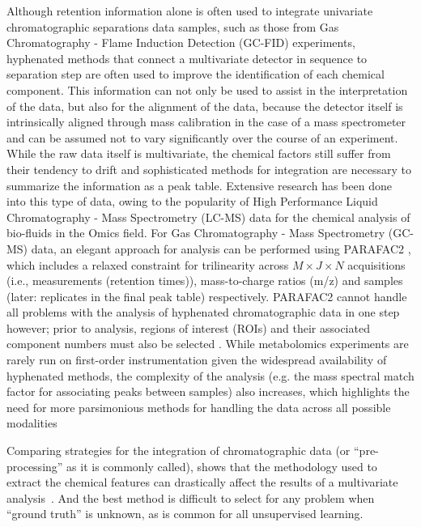 \documentclass[preprint,12pt]{elsarticle}
\begin{document}
Although retention information alone is often used to integrate univariate chromatographic separations data samples, such as those from Gas Chromatography - Flame Induction Detection (GC-FID) experiments, hyphenated methods that connect a multivariate detector in sequence to separation step are often used to improve the identification of each chemical component. This information can not only be used to assist in the interpretation of the data, but also for the alignment of the data, because the detector itself is intrinsically aligned through mass calibration in the case of a mass spectrometer and can be assumed not to vary significantly over the course of an experiment. While the raw data itself is multivariate, the chemical factors still suffer from their tendency to drift and sophisticated methods for integration are necessary to summarize the information as a peak table. Extensive research has been done into this type of data, owing to the popularity of High Performance Liquid Chromatography - Mass Spectrometry (LC-MS) data for the chemical analysis of bio-fluids in the Omics field. For Gas Chromatography - Mass Spectrometry (GC-MS) data, an elegant approach for analysis can be performed using PARAFAC2 \cite{kiers1999parafac2}, which includes a relaxed constraint for trilinearity across $M \times J \times N$ acquisitions (i.e., measurements (retention times)), mass-to-charge ratios (m/z) and samples (later: replicates in the final peak table) respectively. PARAFAC2 cannot handle all problems with the analysis of hyphenated chromatographic data in one step however; prior to analysis, regions of interest (ROIs) and their associated component numbers must also be selected \cite{baccolo2021untargeted,giebelhaus2022untargeted}. While metabolomics experiments are rarely run on first-order instrumentation given the widespread availability of hyphenated methods, the complexity of the analysis (e.g. the mass spectral match factor for associating peaks between samples) also increases, which highlights the need for more parsimonious methods for handling the data across all possible modalities \cite{smith1995handbook}

Comparing strategies for the integration of chromatographic data (or ``pre-processing'' as it is commonly called), shows that the methodology used to extract the chemical features can drastically affect the results of a multivariate analysis~\cite{weggler2021unique}. And the best method is difficult to select for any problem when ``ground truth'' is unknown, as is common for all unsupervised learning.
\end{document}
